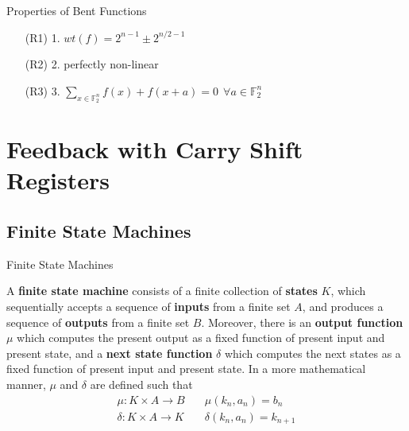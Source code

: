 \documentclass{beamer}
\def\gftwo{\mathbb{F}_2}
\begin{document}
\begin{frame}{Properties of Bent Functions}
  \begin{enumerate}
      \pause
    \item[(R1) 1.] $wt(f)=2^{n-1}\pm2^{n/2-1}$
      \pause
    \item[(R2) 2.] perfectly non-linear
      \pause
    \item[(R3) 3.] $\sum_{x\in\gftwo^n}{f(x)+f(x+a)}=0 \ \ \forall a\in\gftwo^n$
  \end{enumerate}
\end{frame}

\section{Feedback with Carry Shift Registers}
\subsection{Finite State Machines}
\begin{frame}{Finite State Machines}
\begin{definition}
  A {\bf finite state machine} consists of a finite collection of {\bf states}
  $K$, which sequentially accepts a sequence of {\bf inputs} from a finite set
  $A$, and produces a sequence of {\bf outputs} from a finite set
  $B$. Moreover, there is an {\bf output function} $\mu$ which computes
  the present output as a fixed function of present input and present state,
  and a
  {\bf next state function} $\delta$ which computes the next states as a fixed
  function of present input and present state. In a more mathematical manner,
  $\mu$ and $\delta$ are defined such that
  \begin{eqnarray}
    \mu:K \times A \rightarrow B \quad &\mu(k_n,a_n)=b_n \\
    \delta:K \times A \rightarrow K \quad &\delta(k_n,a_n)=k_{n+1}
  \end{eqnarray}
\end{definition}
\end{frame}
\end{document}
